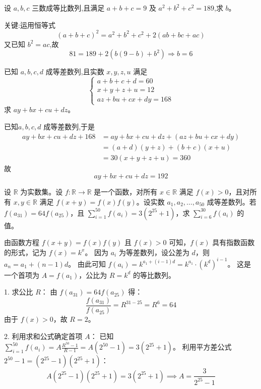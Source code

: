 \begin{questions}
    \question 设 \(a, b, c\) 三数成等比数列,且满足 \(a + b + c = 9\) 及 \(a^2 + b^2 + c^2 = 189\),求 $b$。
    \begin{solution}
        关键:运用恒等式
        \[
        (a+b+c)^2=a^2+b^2+c^2+2(ab+bc+ac)
        \]
        又已知 $b^2=ac$,故
        \[
        81=189+2(b(9-b)+b^2) \Rightarrow b=6
        \]
    \end{solution}
    
    \question 已知 $a,b,c,d$ 成等差数列,且实数 $x,y,z,u$ 满足
    \[
    \begin{cases}
    a+b+c+d = 60 \\
    x+y+z+u = 12 \\
    az + bu + cx + dy = 168
    \end{cases}
    \]
    求 $ay + bx + cu + dz$。
    \begin{solution}
        已知$a,b,c,d$ 成等差数列,于是
        \begin{align*}
        ay + bx + cu + dz+168 
        &=ay + bx + cu + dz+(az + bu + cx + dy) \\
        &=(a+d)(y+z)+(b+c)(x+u)\\
        &=30(x+y+z+u)= 360
        \end{align*}
        故
        \[
        ay + bx + cu + dz=192
        \]
    \end{solution}

    \question 设 $\mathbb{R}$ 为实数集。设 $f : \mathbb{R} \to \mathbb{R}$ 是一个函数，对所有 $x \in \mathbb{R}$ 满足 $f(x) > 0$，且对所有 $x, y \in \mathbb{R}$ 满足 $f(x + y) = f(x)f(y)$。设实数 $a_1, a_2, \dots, a_{50}$ 成等差数列。若 $f(a_{31}) = 64f(a_{25})$，且 $\sum_{i=1}^{50} f(a_i) = 3(2^{25} + 1)$，求 $\sum_{i=6}^{30} f(a_i)$ 的值。

\begin{solution}
    由函数方程 $f(x + y) = f(x)f(y)$ 且 $f(x) > 0$ 可知，$f(x)$ 具有指数函数的形式，记为 $f(x) = k^x$。
    因为 $a_i$ 为等差数列，设公差为 $d$，则 $a_n = a_1 + (n - 1)d$。
    由此可知 $f(a_i) = k^{a_1 + (i-1)d} = k^{a_1} \cdot (k^d)^{i-1}$。
    这是一个首项为 $A = f(a_1)$，公比为 $R = k^d$ 的等比数列。

    1. 求公比 $R$：
    由 $f(a_{31}) = 64f(a_{25})$ 得：
    \[
    \frac{f(a_{31})}{f(a_{25})} = R^{31-25} = R^6 = 64
    \]
    由于 $f(x) > 0$，故 $R = 2$。

    2. 利用求和公式确定首项 $A$：
    已知 $\sum_{i=1}^{50} f(a_i) = A \frac{R^{50} - 1}{R - 1} = A(2^{50} - 1) = 3(2^{25} + 1)$。
    利用平方差公式 $2^{50} - 1 = (2^{25} - 1)(2^{25} + 1)$：
    \[
    A(2^{25} - 1)(2^{25} + 1) = 3(2^{25} + 1) \implies A = \frac{3}{2^{25} - 1}
    \]


\end{solution}
\end{questions}
